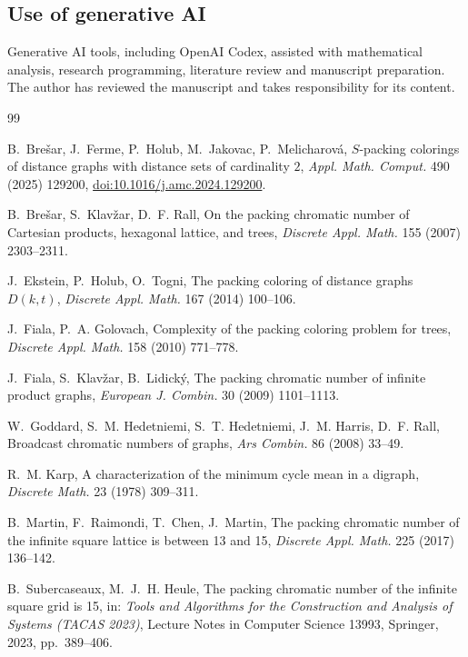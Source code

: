\documentclass[11pt,reqno]{amsart}
\theoremstyle{plain}
\theoremstyle{plain}
\theoremstyle{plain}
\begin{document}
\subsection*{Use of generative AI}
Generative AI tools, including OpenAI Codex, assisted with mathematical
analysis, research programming, literature review and manuscript preparation.
The author has reviewed the manuscript and takes responsibility for its content.
\begin{thebibliography}{99}

B.~Bre\v{s}ar, J.~Ferme, P.~Holub, M.~Jakovac, P.~Melicharov\'a,
\newblock $S$-packing colorings of distance graphs with distance sets of cardinality $2$,
\newblock \emph{Appl. Math. Comput.} 490 (2025) 129200,
\href{https://doi.org/10.1016/j.amc.2024.129200}{doi:10.1016/j.amc.2024.129200}.

B.~Bre\v{s}ar, S.~Klav\v{z}ar, D.~F. Rall,
\newblock On the packing chromatic number of Cartesian products, hexagonal lattice, and trees,
\newblock \emph{Discrete Appl. Math.} 155 (2007) 2303--2311.

J.~Ekstein, P.~Holub, O.~Togni,
\newblock The packing coloring of distance graphs $D(k,t)$,
\newblock \emph{Discrete Appl. Math.} 167 (2014) 100--106.

J.~Fiala, P.~A. Golovach,
\newblock Complexity of the packing coloring problem for trees,
\newblock \emph{Discrete Appl. Math.} 158 (2010) 771--778.

J.~Fiala, S.~Klav\v{z}ar, B.~Lidick\'y,
\newblock The packing chromatic number of infinite product graphs,
\newblock \emph{European J. Combin.} 30 (2009) 1101--1113.

W.~Goddard, S.~M. Hedetniemi, S.~T. Hedetniemi, J.~M. Harris, D.~F. Rall,
\newblock Broadcast chromatic numbers of graphs,
\newblock \emph{Ars Combin.} 86 (2008) 33--49.

R.~M. Karp,
\newblock A characterization of the minimum cycle mean in a digraph,
\newblock \emph{Discrete Math.} 23 (1978) 309--311.

B.~Martin, F.~Raimondi, T.~Chen, J.~Martin,
\newblock The packing chromatic number of the infinite square lattice is between 13 and 15,
\newblock \emph{Discrete Appl. Math.} 225 (2017) 136--142.

B.~Subercaseaux, M.~J.~H. Heule,
\newblock The packing chromatic number of the infinite square grid is 15,
\newblock in: \emph{Tools and Algorithms for the Construction and Analysis of Systems (TACAS 2023)},
  Lecture Notes in Computer Science 13993, Springer, 2023, pp.~389--406.


\end{thebibliography}
\end{document}
